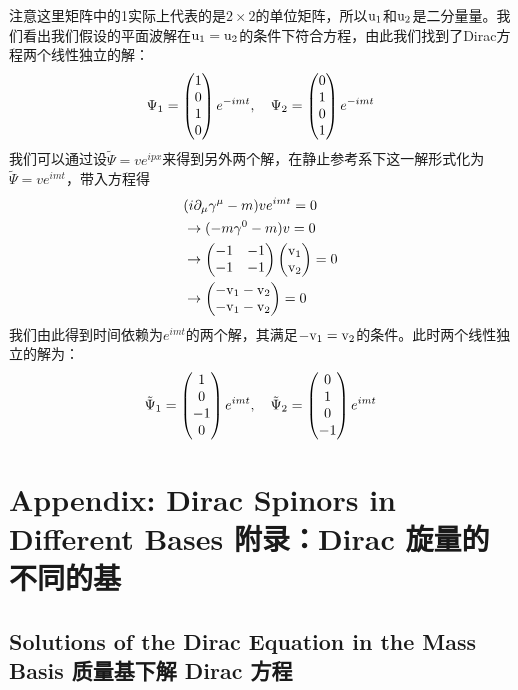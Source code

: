 注意这里矩阵中的1实际上代表的是$2 \times 2$的单位矩阵，所以$\rm u_1$和$\rm u_2$是二分量量。我们看出我们假设的平面波解在$\rm u_1 =u_2$的条件下符合方程，由此我们找到了Dirac方程两个线性独立的解：
\begin{equation}
\Psi_1=\begin{pmatrix} 1\\0\\1\\0 \end{pmatrix} e^{-imt},~~~\Psi_2=\begin{pmatrix} 0\\1\\0\\1 \end{pmatrix} e^{-imt}
\end{equation}
我们可以通过设$\tilde \Psi =ve^{ipx}$来得到另外两个解，在静止参考系下这一解形式化为$\tilde \Psi=ve^{imt}$，带入方程得
\begin{equation}
\begin{split}
&(i\partial_\mu\gamma^\mu-m)ve^{imt}=0\\
&\to (-m\gamma^0-m)v=0\\
&\to \begin{pmatrix} -1 & -1 \\ -1 & -1 \end{pmatrix} \begin{pmatrix} \rm v_1 \\ \rm v_2 \end{pmatrix} =0\\
&\to \begin{pmatrix} \rm -v_1-v_2 \\ \rm -v_1-v_2 \end{pmatrix} =0
\end{split}
\end{equation}
我们由此得到时间依赖为$e^{imt}$的两个解，其满足$\rm -v_1=v_2$的条件。此时两个线性独立的解为：
\begin{equation}
\tilde \Psi_1=\begin{pmatrix} 1\\0\\-1\\0 \end{pmatrix} e^{imt},~~~\tilde \Psi_2=\begin{pmatrix} 0\\1\\0\\-1 \end{pmatrix} e^{imt}
\end{equation}


\section[附录：Dirac 旋量的不同的基]{Appendix: Dirac Spinors in Different Bases 附录：Dirac 旋量的不同的基}\label{sec8.10}
\subsection[质量基下解 Dirac 方程]{Solutions of the Dirac Equation in the Mass Basis 质量基下解 Dirac 方程}\label{sec8.10.1}
